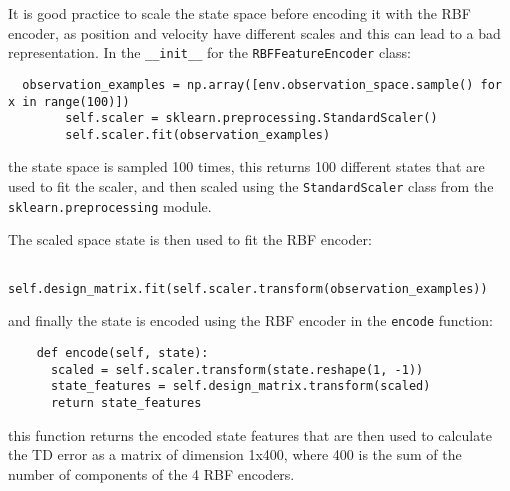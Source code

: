 \documentclass{article}
\begin{document}
It is good practice to scale the state space before encoding it with the RBF encoder,
as position and velocity have different scales and this can lead to a bad representation.
In the \texttt{\_\_init\_\_} for the \texttt{RBFFeatureEncoder} class:
\begin{verbatim}
  observation_examples = np.array([env.observation_space.sample() for x in range(100)])
        self.scaler = sklearn.preprocessing.StandardScaler()
        self.scaler.fit(observation_examples)
\end{verbatim}

the state space is sampled 100 times, this returns 100 different states that are used to fit the scaler,
and then scaled using the \texttt{StandardScaler} class from the \texttt{sklearn.preprocessing} module.

The scaled space state is then used to fit the RBF encoder:

\begin{verbatim}
    self.design_matrix.fit(self.scaler.transform(observation_examples))
\end{verbatim}

and finally the state is encoded using the RBF encoder in the \texttt{encode} function:

\begin{verbatim}
    def encode(self, state):
      scaled = self.scaler.transform(state.reshape(1, -1))
      state_features = self.design_matrix.transform(scaled)
      return state_features
\end{verbatim}

this function returns the encoded state features that are then used to calculate the TD error as a matrix
of dimension 1x400, where 400 is the sum of the number of components of the 4 RBF encoders.
\end{document}
